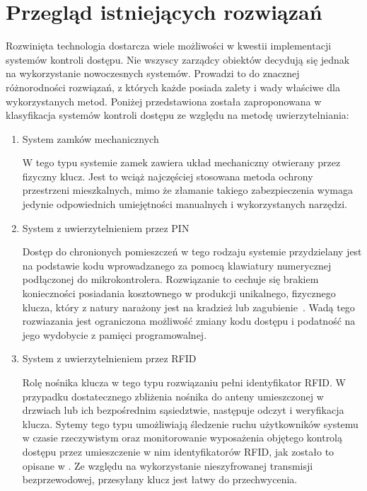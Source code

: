 	\section{Przegląd istniejących rozwiązań}

		Rozwinięta technologia dostarcza wiele możliwości w kwestii implementacji systemów kontroli dostępu. Nie wszyscy zarządcy obiektów decydują się jednak na wykorzystanie nowoczesnych systemów. Prowadzi to do znacznej różnorodności rozwiązań, z których każde posiada zalety i wady właściwe dla wykorzystanych metod. Poniżej przedstawiona została zaproponowana w \cite{access-system-survey} klasyfikacja systemów kontroli dostępu ze względu na metodę uwierzytelniania:
		\begin{enumerate}[label=\Alph*.]
			\item System zamków mechanicznych

				W tego typu systemie zamek zawiera układ mechaniczny otwierany przez fizyczny klucz. Jest to wciąż najczęściej stosowana metoda ochrony przestrzeni mieszkalnych, mimo że złamanie takiego zabezpieczenia wymaga jedynie odpowiednich umiejętności manualnych i wykorzystanych narzędzi.

			\item System z uwierzytelnieniem przez PIN

				Dostęp do chronionych pomieszczeń w tego rodzaju systemie przydzielany jest na podstawie kodu wprowadzanego za pomocą klawiatury numerycznej podłączonej do mikrokontrolera. Rozwiązanie to cechuje się brakiem konieczności posiadania kosztownego w produkcji unikalnego, fizycznego klucza, który z natury narażony jest na kradzież lub zagubienie~\cite{keypad-access-system}. Wadą tego rozwiazania jest ograniczona możliwość zmiany kodu dostępu i podatność na jego wydobycie z pamięci programowalnej.

			\item System z uwierzytelnieniem przez RFID

				Rolę nośnika klucza w tego typu rozwiązaniu pełni identyfikator RFID. W przypadku dostatecznego zbliżenia nośnika do anteny umieszczonej w drzwiach lub ich bezpośrednim sąsiedztwie, następuje odczyt i weryfikacja klucza. Sytemy tego typu umożliwiają śledzenie ruchu użytkowników systemu w czasie rzeczywistym oraz monitorowanie wyposażenia objętego kontrolą dostępu przez umieszczenie w nim identyfikatorów RFID, jak zostało to opisane w \cite{rfid-access-system-for-university}. Ze względu na wykorzystanie nieszyfrowanej transmisji bezprzewodowej, przesyłany klucz jest łatwy do przechwycenia.


\end{enumerate}
